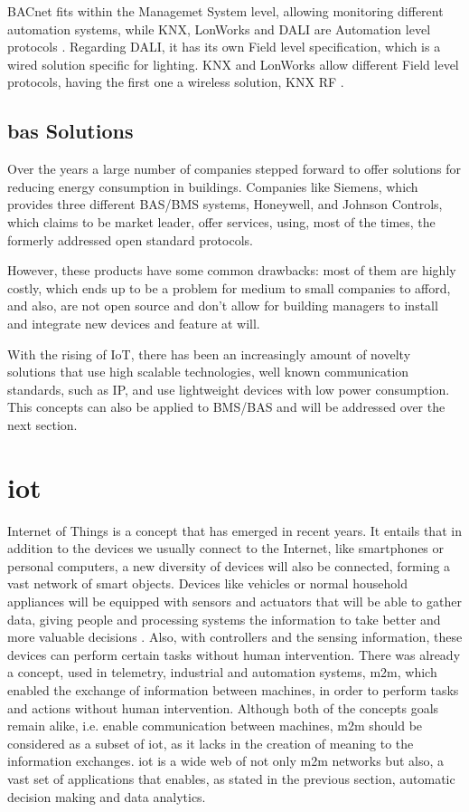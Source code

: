 BACnet fits within the Managemet System level, allowing monitoring different automation systems, while KNX, LonWorks and DALI are Automation level protocols \cite{Siemens2013}. Regarding DALI, it has its own Field level specification, which is a wired solution specific for lighting. KNX and LonWorks allow different Field level protocols, having the first one a wireless solution, KNX RF \cite{Reinisch2007}.

\subsection{\ac{bas} Solutions}

Over the years a large number of companies stepped forward to offer solutions for reducing energy consumption in buildings. Companies like Siemens, which provides three different BAS/BMS systems, Honeywell, and Johnson Controls, which claims to be market leader, offer services, using, most of the times, the formerly addressed open standard protocols.


However, these products have some common drawbacks: most of them are highly costly, which ends up to be a problem for medium to small companies to afford, and also, are not open source and don't allow for building managers to install and integrate new devices and feature at will. 

With the rising of IoT, there has been an increasingly amount of novelty solutions that use high scalable technologies, well known communication standards, such as IP, and use lightweight devices with low power consumption. This concepts can also be applied to BMS/BAS and will be addressed over the next section.

\section{\acf{iot}}

Internet of Things is a concept that has emerged in recent years. It entails that in addition to the devices we usually connect to the Internet, like smartphones or personal computers, a new diversity of devices will also be connected, forming a vast network of smart objects. Devices like vehicles or normal household appliances will be equipped with sensors and actuators that will be able to gather data, giving people and processing systems the information to take better and more valuable decisions \cite{Weiser1991}. Also, with controllers and the sensing information, these devices can perform certain tasks without human intervention. There was already a concept, used in telemetry, industrial and automation systems, \acf{m2m}, which enabled the exchange of information between machines, in order to perform tasks and actions without human intervention. Although both of the concepts goals remain alike, i.e. enable communication between machines, \ac{m2m} should be considered as a subset of \ac{iot}, as it lacks in the creation of meaning to the information exchanges. \ac{iot} is a wide web of not only \ac{m2m} networks but also, a vast set of applications that enables, as stated in the previous section, automatic decision making and data analytics. 

